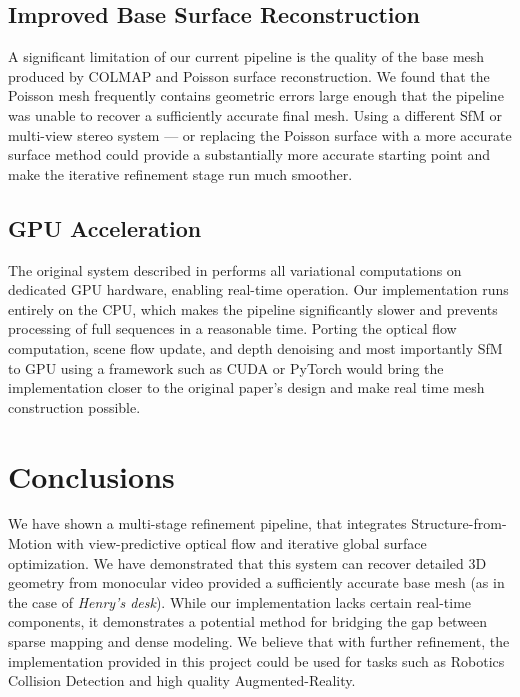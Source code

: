 \documentclass[10pt,twocolumn]{article}
\begin{document}
\subsection{Improved Base Surface Reconstruction}

A significant limitation of our current pipeline is the quality of the base 
mesh produced by COLMAP and Poisson surface reconstruction. We found that 
the Poisson mesh frequently contains geometric errors large enough that the 
pipeline was unable to recover a sufficiently accurate final mesh. Using a different SfM or multi-view stereo system — or replacing the Poisson surface with a more accurate surface method could provide a substantially more accurate starting point and make the iterative refinement stage run much smoother.

\subsection{GPU Acceleration}

The original system described in \cite{newcombe2010} performs all variational 
computations on dedicated GPU hardware, enabling real-time operation. Our 
implementation runs entirely on the CPU, which makes the pipeline 
significantly slower and prevents processing of full sequences in a 
reasonable time. Porting the optical flow computation, scene flow update, and 
depth denoising and most importantly SfM to GPU using a framework such as CUDA or PyTorch would bring the implementation closer to the original paper's design and make real time mesh construction possible.

\section{Conclusions}

We have shown a multi-stage refinement pipeline, that integrates Structure-from-Motion with view-predictive optical flow and iterative global surface optimization. We have demonstrated that this system can recover detailed 3D geometry from monocular video provided a sufficiently accurate base mesh (as in the case of \textit{Henry's desk}). While our implementation lacks certain real-time components, it demonstrates a potential method for bridging the gap between sparse mapping and dense modeling. We believe that with further refinement, the implementation provided in this project could be used for tasks such as Robotics Collision Detection and high quality Augmented-Reality.
\end{document}
